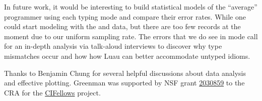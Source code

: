 \documentclass[english,submission,cleveref]{programming}
\begin{document}
In future work, it would be interesting to build statistical models of
the ``average'' programmer using each typing mode and compare their error
rates.
While one could start modeling with the \mnocheck{} and \mnonstrict{}
data, but there are too few \mstrict{} records at the moment due to our uniform
sampling rate.
The errors that we do see in \mstrict{} mode call for an in-depth analysis via
talk-aloud interviews to discover why type mismatches occur and how how Luau
can better accommodate untyped idioms.




\acks

Thanks to Benjamin Chung for several helpful discussions about data analysis
and effective plotting.
Greenman was supported by
NSF grant \href{https://nsf.gov/awardsearch/showAward?AWD_ID=2030859&HistoricalAwards=false}{2030859}
to the CRA for the \href{https://cifellows2020.org}{CIFellows} project.

%
%
%
%
%
%


\end{document}
